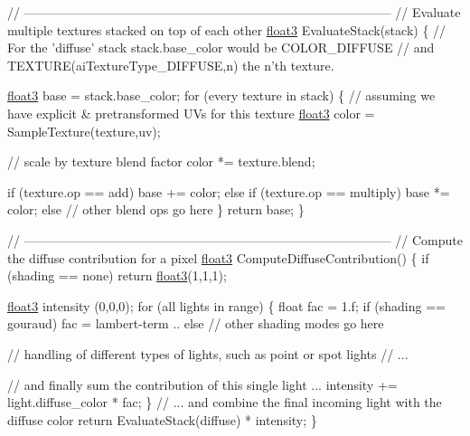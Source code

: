 \begin{DoxyCode}
\textcolor{comment}{// ---------------------------------------------------------------------------------------}
\textcolor{comment}{// Evaluate multiple textures stacked on top of each other}
\hyperlink{structfloat3}{float3} EvaluateStack(stack)
\{
  \textcolor{comment}{// For the 'diffuse' stack stack.base\_color would be COLOR\_DIFFUSE}
  \textcolor{comment}{// and TEXTURE(aiTextureType\_DIFFUSE,n) the n'th texture.}

  \hyperlink{structfloat3}{float3} base = stack.base\_color;
  \textcolor{keywordflow}{for} (every texture in stack)
  \{
    \textcolor{comment}{// assuming we have explicit & pretransformed UVs for this texture}
    \hyperlink{structfloat3}{float3} color = SampleTexture(texture,uv); 

    \textcolor{comment}{// scale by texture blend factor}
    color *= texture.blend;

    \textcolor{keywordflow}{if} (texture.op == add)
      base += color;
    \textcolor{keywordflow}{else} \textcolor{keywordflow}{if} (texture.op == multiply)
      base *= color;
    \textcolor{keywordflow}{else} \textcolor{comment}{// other blend ops go here}
  \}
  \textcolor{keywordflow}{return} base;
\}

\textcolor{comment}{// ---------------------------------------------------------------------------------------}
\textcolor{comment}{// Compute the diffuse contribution for a pixel}
\hyperlink{structfloat3}{float3} ComputeDiffuseContribution()
\{
  \textcolor{keywordflow}{if} (shading == none)
     \textcolor{keywordflow}{return} \hyperlink{structfloat3}{float3}(1,1,1);

  \hyperlink{structfloat3}{float3} intensity (0,0,0);
  \textcolor{keywordflow}{for} (all lights in range)
  \{
    \textcolor{keywordtype}{float} fac = 1.f;
    \textcolor{keywordflow}{if} (shading == gouraud)
      fac =  lambert-term ..
    \textcolor{keywordflow}{else} \textcolor{comment}{// other shading modes go here}

    \textcolor{comment}{// handling of different types of lights, such as point or spot lights}
    \textcolor{comment}{// ...}

    \textcolor{comment}{// and finally sum the contribution of this single light ...}
    intensity += light.diffuse\_color * fac;
  \}
  \textcolor{comment}{// ... and combine the final incoming light with the diffuse color}
  \textcolor{keywordflow}{return} EvaluateStack(diffuse) * intensity;
\}


\end{DoxyCode}
